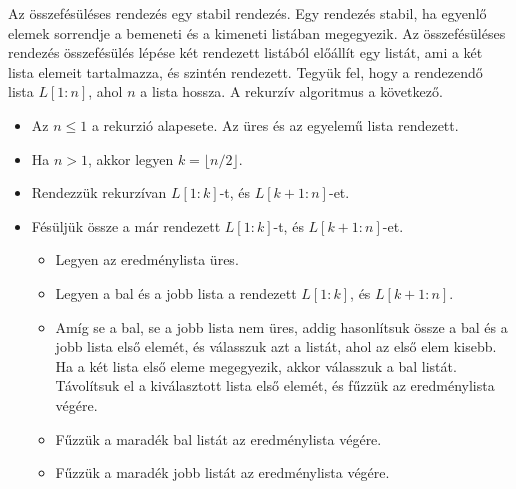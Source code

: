 \documentclass[12pt]{report}
\begin{document}
Az összefésüléses rendezés egy stabil rendezés.
Egy rendezés stabil, ha egyenlő elemek sorrendje a bemeneti
és a kimeneti listában megegyezik.
Az összefésüléses rendezés összefésülés lépése két rendezett listából
előállít egy listát, ami a két lista elemeit tartalmazza,
és szintén rendezett.
Tegyük fel, hogy a rendezendő lista $L[1:n]$,
ahol $n$ a lista hossza.
A rekurzív algoritmus a következő.
\begin{itemize}
\item Az $n \le 1$ a rekurzió alapesete. Az üres és az egyelemű lista rendezett.
\item Ha $n > 1$, akkor legyen $k = \lfloor n/2 \rfloor$.
\item Rendezzük rekurzívan $L[1:k]$-t, és $L[k+1:n]$-et.
\item Fésüljük össze a már rendezett $L[1:k]$-t, és $L[k+1:n]$-et.
\begin{itemize}
\item Legyen az eredménylista üres.
\item Legyen a bal és a jobb lista a rendezett $L[1:k]$, és $L[k+1:n]$.
\item Amíg se a bal, se a jobb lista nem üres,
addig hasonlítsuk össze a bal és a jobb lista első elemét,
és válasszuk azt a listát, ahol az első elem kisebb.
Ha a két lista első eleme megegyezik, akkor válasszuk a bal listát.
Távolítsuk el a kiválasztott lista első elemét,
és fűzzük az eredménylista végére.
\item Fűzzük a maradék bal listát az eredménylista végére.
\item Fűzzük a maradék jobb listát az eredménylista végére.
\end{itemize}
\end{itemize}
\end{document}
